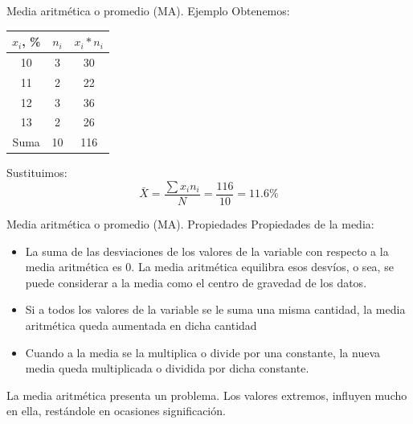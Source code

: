 \documentclass[11pt]{beamer}
\begin{document}
        \begin{frame}{Media aritmética o promedio (MA). Ejemplo}
          Obtenemos:
            \begin{table}[!h]
                \centering
                \begin{tabular}{|c|c|c|}
                    \hline
                    $x_i$, \% & $n_i$ & $x_i* n_i$\\
                    \hline
                    10  & 3 & 30\\
                    \hline
                    11  & 2 & 22\\
                    \hline
                    12  & 3 & 36\\
                    \hline
                    13  & 2 & 26\\
                    \hline
                    Suma & 10 & 116\\
                    \hline
                \end{tabular}
            \end{table}
        \pause
        Sustituimos:\\
        $$ \bar{X} =\dfrac{\sum x_in_i}{N}=\dfrac{116}{10}=11.6\%$$
    \end{frame}
        \begin{frame}{Media aritmética o promedio (MA). Propiedades}
          Propiedades de la media:
          \begin{itemize}
              \item La suma de las desviaciones de los valores de la variable con respecto a la media aritmética es 0. La media aritmética equilibra esos desvíos, o sea, se puede considerar a la media como el centro de gravedad de los datos.
              \item Si a todos los valores de la variable se le suma una misma cantidad, la media aritmética queda aumentada en dicha cantidad
              \item Cuando a la media se la multiplica o divide por una constante, la nueva media queda multiplicada o dividida por dicha constante.
          \end{itemize}
          \pause
          La media aritmética presenta un problema. Los valores extremos, influyen mucho en ella, restándole en ocasiones significación.
        \end{frame}
\end{document}
